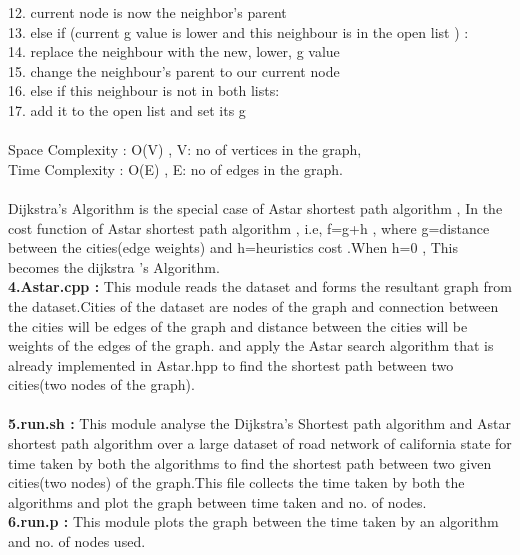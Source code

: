 \documentclass[14pt,a4]{extreport}
\begin{document}
12.      \hspace{40}              current node is now the neighbor's parent           \\ 
13.\hspace{20}                 else if (current g value is lower and this neighbour is in the open list ) :\\
14.  \hspace{40}                   replace the neighbour with the new, lower, g value \\
15.      \hspace{40}               change the neighbour's parent to our current node\\
16.  \hspace{20}          else if this neighbour is not in both lists:\\
17.    \hspace{40}                 add it to the open list and set its g\\
\\
Space Complexity : O(V) , V: no of vertices in the graph,\\
Time Complexity : O(E) , E: no of edges in the graph.
\\\\
Dijkstra's Algorithm is the special case of Astar shortest path algorithm  , In the cost function of Astar shortest path algorithm , i.e, f=g+h , where g=distance between the cities(edge weights) and h=heuristics cost .When h=0 , This becomes the dijkstra 's Algorithm.
\\

\textbf{4.Astar.cpp : }This module reads the dataset and forms the resultant graph from the dataset.Cities of the dataset are nodes of the graph and connection between the cities will be edges of the graph and distance between the cities will be weights of the edges of the graph. and apply the Astar search algorithm that is already implemented in Astar.hpp to find the shortest path between two cities(two nodes of the graph).
\\\\
\textbf{5.run.sh :} This module analyse the Dijkstra's Shortest path algorithm and Astar shortest path algorithm over a large dataset of road network of california state for time taken by both the algorithms to find the shortest path between two given cities(two nodes) of the graph.This file collects the time taken by both the algorithms and plot the graph between time taken and no. of nodes.
\\
\textbf{6.run.p :} This module plots the graph between the time taken by an algorithm and no. of nodes used.
\end{document}
